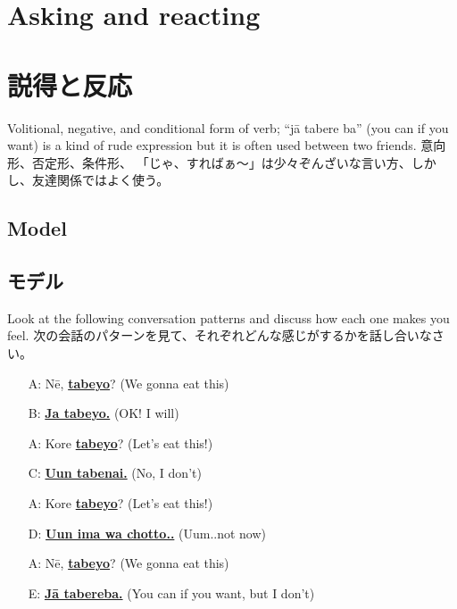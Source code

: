 \documentclass[uplatex,dvipdfmx,b5paper,english,10pt]{jsbook}
\begin{document}
%

\ifEnglish
\section{Asking and reacting}
\else
\section{説得と反応}
\fi

\ifEnglish
Volitional, negative, and conditional form of verb;
``j\=a tabere ba'' (you can if you want) is a kind of rude expression but it is often used between two friends.
\else
意向形、否定形、条件形、
「じゃ、すればぁ〜」は少々ぞんざいな言い方、しかし、友達関係ではよく使う。
\fi


\ifEnglish
\subsection{Model}
\else
\subsection{モデル}
\fi

\begin{toiquestion}
\ifEnglish
Look at the following conversation patterns and discuss how each one makes you feel.
\else
次の会話のパターンを見て、それぞれどんな感じがするかを話し合いなさい。
\fi
\end{toiquestion}

\begin{itemize}
 \item[A:] N\=e, \underline{{\bfseries tabeyo}}? (We gonna eat this)
 \item[B:] \underline{{\bfseries Ja tabeyo.}} (OK! I will)
 \item[A:] Kore \underline{{\bfseries tabeyo}}? (Let's eat this!)
 \item[C:] \underline{{\bfseries Uun tabenai.}} (No, I don't)
 \item[A:] Kore \underline{{\bfseries tabeyo}}? (Let's eat this!)
 \item[D:] \underline{{\bfseries Uun ima wa chotto..}} (Uum..not now)
 \item[A:] N\=e, \underline{{\bfseries tabeyo}}? (We gonna eat this)
 \item[E:] \underline{{\bfseries J\=a tabereba.}} (You can if you want, but I don't)
\end{itemize}
\end{document}
